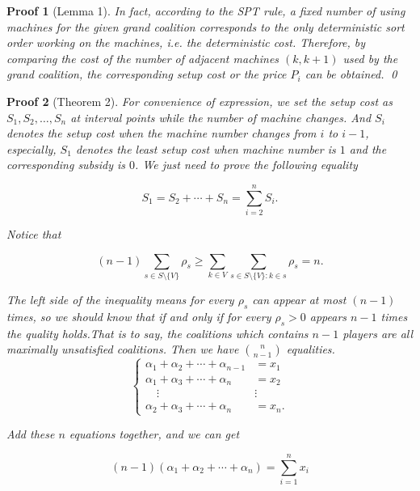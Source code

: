 \documentclass[UTF8]{article}
\newtheorem{pf}{\hspace{2em}Proof}
\begin{document}
\begin{pf}[Lemma 1]
  In fact, according to the SPT rule, a fixed number of using machines for the given grand coalition corresponds to the only deterministic sort order working on the machines, i.e. the deterministic cost. Therefore, by comparing the cost of the number of adjacent machines $(k, k + 1)$ used by the grand coalition, the corresponding setup cost or the price $P_i$ can be obtained.
  \qed
\end{pf}


\begin{pf}[Theorem 2]

For convenience of expression, we set the setup cost as $S_{1},S_{2}, \dots ,S_{n}$ at interval points while the number of machine changes.
And $S_{i}$ denotes the setup cost when the machine number changes from $i$ to $i-1$, especially, $S_{1}$ denotes the least setup cost when machine number is $1$ and the corresponding subsidy is $0$.
We just need to prove the following equality

\begin{displaymath}
  S_{1}=S_{2}+\cdots+S_{n}=\sum_{i=2}^n S_i.
\end{displaymath}

Notice that

\begin{displaymath}
  (n-1) \sum_{s \in S \setminus\{V\} } \rho_s \geq
  \sum_{k\in V}\sum_{s \in S \setminus\{V\}:k \in s} \rho_s = n.
\end{displaymath}

The left side of the inequality means for every $\rho_s$ can appear at most $(n-1)$ times, so we should know that if and only if for every $\rho_s > 0$ appears $n-1$ times the quality holds.That is to say, the coalitions which contains $n-1$ players are all maximally unsatisfied coalitions. Then we have $n \choose n-1$ equalities.
\[
\begin{cases}
 \alpha_1+\alpha_2+ \cdots+\alpha_{n-1} & = x_1 \\
 \alpha_1+\alpha_3+ \cdots+\alpha_n & = x_2 \\
 \quad   \vdots        &\vdots\\
 \alpha_2+\alpha_3+ \cdots+\alpha_n & = x_n.
\end{cases}
\]

Add these $n$ equations together, and we can get

\begin{equation*}
  (n-1)(\alpha_1+\alpha_2+ \cdots+\alpha_n)=\sum_{i=1}^{n}x_i
\end{equation*}


\end{pf}
\end{document}
